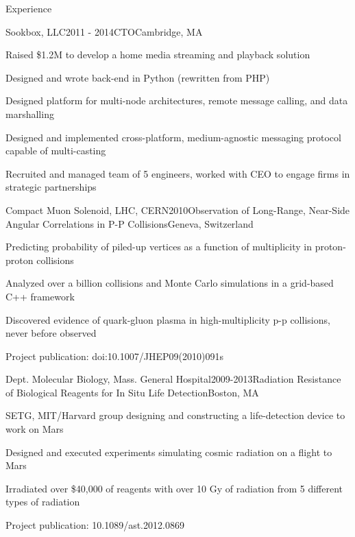\documentclass{resume}
\begin{document}

\begin{rSection}{Experience}

\begin{rSubsection}{Sookbox, LLC}{2011 - 2014}{CTO}{Cambridge, MA}
\item Raised \$1.2M to develop a home media streaming and playback solution
\item Designed and wrote back-end in Python (rewritten from PHP)
\item Designed platform for multi-node architectures, remote message calling, and data marshalling
\item Designed and implemented cross-platform, medium-agnostic messaging protocol capable of multi-casting
\item Recruited and managed team of 5 engineers, worked with CEO to engage firms in strategic partnerships
\end{rSubsection}

\begin{rSubsection}{Compact Muon Solenoid, LHC, CERN}{2010}{Observation of Long-Range, Near-Side Angular Correlations in P-P Collisions}{Geneva, Switzerland}
\item Predicting probability of piled-up vertices as a function of multiplicity in proton-proton collisions
\item Analyzed over a billion collisions and Monte Carlo simulations in a grid-based C++ framework
\item Discovered evidence of quark-gluon plasma in high-multiplicity p-p collisions, never before observed
\item Project publication: doi:10.1007/JHEP09(2010)091s
\end{rSubsection}


\begin{rSubsection}{Dept. Molecular Biology, Mass. General Hospital}{2009-2013}{Radiation Resistance of Biological Reagents for In Situ Life Detection}{Boston, MA}
\item SETG, MIT/Harvard group designing and constructing a life-detection device to work on Mars
\item Designed and executed experiments simulating cosmic radiation on a flight to Mars
\item Irradiated over \$40,000 of reagents with over 10 Gy of radiation from 5 different types of radiation
\item Project publication: 10.1089/ast.2012.0869
\end{rSubsection}

\end{rSection}
\end{document}
